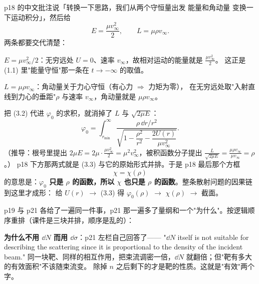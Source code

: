 \documentclass[11pt]{ctexart}
\begin{document}

p18 的中文批注说「转换一下思路，我们从两个守恒量出发 能量和角动量 变换一下运动积分」，然后给
\[
E=\frac{\mu v_\infty^2}{2},\qquad L=\mu\rho v_\infty . \tag{3.2}
\]
两条都要交代清楚：

\textbf{$E=\mu v_\infty^2/2$}：无穷远处 $U=0$、速率 $v_\infty$，故相对运动的能量就是 $\frac{\mu v_\infty^2}{2}$。
这正是 (1.1) 里"能量守恒"那一条在 $t\to-\infty$ 的取值。

\textbf{$L=\mu\rho v_\infty$}：角动量关于力心守恒（有心力 $\Rightarrow$ 力矩为零），
在无穷远处取"入射直线到力心的垂距"$\rho$ 与速率 $v_\infty$，角动量就是 $\mu\rho v_\infty$。


把 (3.2) 代进 $\varphi_0$ 的求积，就消掉了 $L$ 与 $\sqrt{2\mu E}$：
\[
\varphi_0=\int_{r_{\min}}^{\infty}\frac{\rho\,\dd r/r^2}{\sqrt{1-\dfrac{\rho^2}{r^2}-\dfrac{2U(r)}{\mu v_\infty^2}}} . \tag{3.3}
\]
（推导：根号里提出 $2\mu E=2\mu\cdot\frac{\mu v_\infty^2}{2}=\mu^2v_\infty^2$，被积函数分子提出 $\frac{L}{\sqrt{2\mu E}}=\frac{\mu\rho v_\infty}{\mu v_\infty}=\rho$。）
p18 下方那两式就是 (3.3) 与它的原始形式并排。于是 p18 最后那个方框
\[
\chi=\chi(\rho)
\]
的意思是：\textbf{$\varphi_0$ 只是 $\rho$ 的函数，所以 $\chi$ 也只是 $\rho$ 的函数}。整条散射问题的因果链到这里才成形：
给 $U(r)$ $\to$ (3.3) 得 $\varphi_0(\rho)$ $\to$ $\chi(\rho)$ $\to$ 截面。


p19 与 p21 各给了一遍同一件事，p21 那一遍多了量纲和一个"为什么"。按逻辑顺序重排（课件是三块并排，顺序是乱的）：


\textbf{为什么不用 $\dd N$ 而用 $\dd\sigma$}：p21 左栏自己回答了——
"$\dd N$ itself is not suitable for describing the scattering since it is proportional to the density of the incident beam."
同一块靶、同样的相互作用，把束流调密一倍，$\dd N$ 就翻倍；但"靶有多大的有效面积"不该随束流变。
除掉 $n$ 之后剩下的才是靶的性质。这就是"有效"两个字。
\end{document}
